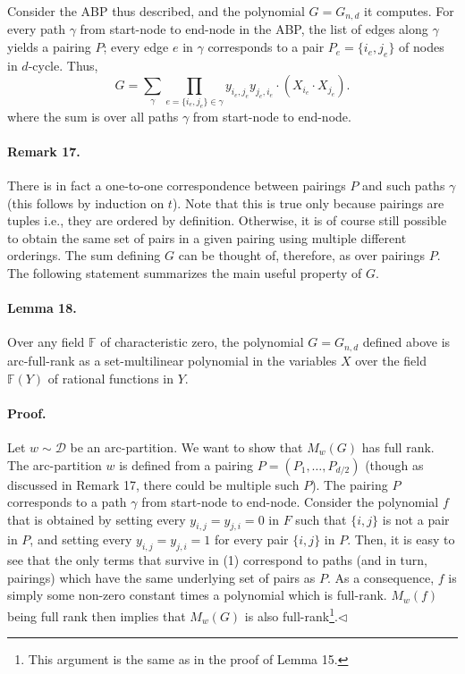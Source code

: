 Consider the ABP thus described, and the polynomial $G=G_{n,d}$ it computes. For every path $\gamma$ from start-node to end-node in the ABP, the list of edges along $\gamma$ yields a pairing $P$; every edge $e$ in $\gamma$ corresponds to a pair $P_e=\{i_e,j_e\}$ of nodes in $d$-cycle. Thus,
\[G=\sum_\gamma\prod_{e=\{i_e,j_e\}\in\gamma}y_{i_e,j_e}y_{j_e,i_e}\cdot(X_{i_e}\cdot X_{j_e}).\tag{1}\]
where the sum is over all paths $\gamma$ from start-node to end-node.
\paragraph{Remark 17.} There is in fact a one-to-one correspondence between pairings $P$ and such paths $\gamma$ (this follows by induction on $t$). Note that this is true only because pairings are tuples i.e., they are ordered by definition. Otherwise, it is of course still possible to obtain the same set of pairs in a given pairing using multiple different orderings. The sum defining $G$ can be thought of, therefore, as over pairings $P$.
The following statement summarizes the main useful property of $G$.
\paragraph{Lemma 18.} Over any field $\mathbb F$ of characteristic zero, the polynomial $G=G_{n,d}$ defined above is arc-full-rank as a set-multilinear polynomial in the variables $X$ over the field $\mathbb F(Y)$ of rational functions in $Y$.
\paragraph{Proof.} Let $w\sim\mathcal D$ be an arc-partition. We want to show that $M_w(G)$ has full rank. The arc-partition $w$ is defined from a pairing $P=(P_1,\ldots,P_{d/2})$ (though as discussed in Remark 17, there could be multiple such $P$). The pairing $P$ corresponds to a path $\gamma$ from start-node to end-node. Consider the polynomial $f$ that is obtained by setting every $y_{i,j}=y_{j,i}=0$ in $F$ such that $\{i,j\}$ is not a pair in $P$, and setting every $y_{i,j}=y_{j,i}=1$ for every pair $\{i,j\}$ in $P$. Then, it is easy to see that the only terms that survive in (1) correspond to paths (and in turn, pairings) which have the same underlying set of pairs as $P$. As a consequence, $f$ is simply some non-zero constant times a polynomial which is full-rank. $M_w(f)$ being full rank then implies that $M_w(G)$ is also full-rank\footnote{This argument is the same as in the proof of Lemma 15.}.\hfill$\triangleleft$
